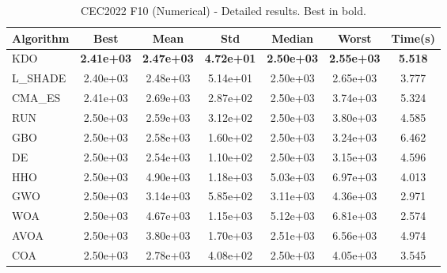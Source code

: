 \begin{table}[H]
\centering\small
\caption{CEC2022 F10 (Numerical) - Detailed results. Best in bold.}
\label{tab:cec2022_F10}
\begin{tabular}{lcccccc}
\toprule
\textbf{Algorithm} & \textbf{Best} & \textbf{Mean} & \textbf{Std} & \textbf{Median} & \textbf{Worst} & \textbf{Time(s)} \\
\midrule
KDO & \textbf{2.41e+03} & \textbf{2.47e+03} & \textbf{4.72e+01} & \textbf{2.50e+03} & \textbf{2.55e+03} & \textbf{5.518} \\
L_SHADE & 2.40e+03 & 2.48e+03 & 5.14e+01 & 2.50e+03 & 2.65e+03 & 3.777 \\
CMA_ES & 2.41e+03 & 2.69e+03 & 2.87e+02 & 2.50e+03 & 3.74e+03 & 5.324 \\
RUN & 2.50e+03 & 2.59e+03 & 3.12e+02 & 2.50e+03 & 3.80e+03 & 4.585 \\
GBO & 2.50e+03 & 2.58e+03 & 1.60e+02 & 2.50e+03 & 3.24e+03 & 6.462 \\
DE & 2.50e+03 & 2.54e+03 & 1.10e+02 & 2.50e+03 & 3.15e+03 & 4.596 \\
HHO & 2.50e+03 & 4.90e+03 & 1.18e+03 & 5.03e+03 & 6.97e+03 & 4.013 \\
GWO & 2.50e+03 & 3.14e+03 & 5.85e+02 & 3.11e+03 & 4.36e+03 & 2.971 \\
WOA & 2.50e+03 & 4.67e+03 & 1.15e+03 & 5.12e+03 & 6.81e+03 & 2.574 \\
AVOA & 2.50e+03 & 3.80e+03 & 1.70e+03 & 2.51e+03 & 6.56e+03 & 4.974 \\
COA & 2.50e+03 & 2.78e+03 & 4.08e+02 & 2.50e+03 & 4.05e+03 & 3.545 \\
\bottomrule
\end{tabular}
\end{table}
